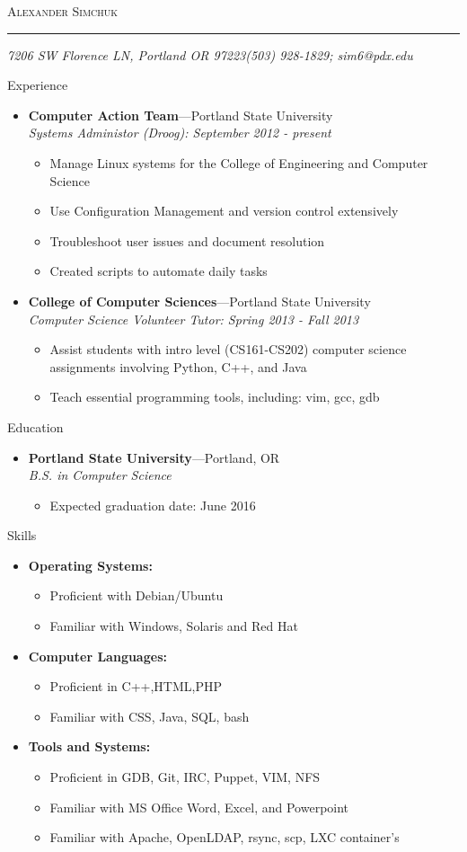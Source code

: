 \documentclass[11pt,oneside]{article}
\makeatletter
\newcommand{\name}{Alexander Simchuk}
\newcommand{\addr}{7206 SW Florence LN, Portland OR 97223}
\newcommand{\phone}{(503) 928-1829}
\newcommand{\email}{sim6@pdx.edu}
\newcommand{\bigname}[1]{
	\begin{center}\fontfamily{phv}\selectfont\Huge\scshape#1\end{center}
}
\newenvironment{ressection}[1]{
	\vspace{4pt}
	{\fontfamily{phv}\selectfont\Large#1}
	\begin{itemize}
	\vspace{3pt}
}{
	\end{itemize}
}
\newcommand{\resitem}[1]{
	\vspace{-4pt}
	\item \begin{flushleft} #1 \end{flushleft}
}
\newcommand{\ressubitem}[1]{
	\vspace{-1pt}
	\item \begin{flushleft} #1 \end{flushleft}
}
\newcommand{\resbigitem}[3]{
	\vspace{-5pt}
	\item
	\textbf{#1}---#2 \\
	\textit{#3}
}
\newenvironment{ressubsec}[3]{
	\resbigitem{#1}{#2}{#3}
	\vspace{-2pt}
	\begin{itemize}
}{
	\end{itemize}
}
\newenvironment{reslist}[1]{
	\resitem{\textbf{#1}}
	\vspace{-5pt}
	\begin{itemize}
}{
	\end{itemize}
}
\makeatother
\begin{document}
 \selectfont
\bigname{\name}
\vspace{-8pt} \rule{\textwidth}{1pt}
\vspace{-1pt} {\small\itshape \addr \hfill \phone; \email}
\vspace{8 pt}


\begin{ressection}{Experience}
    \begin{ressubsec}{Computer Action Team}{Portland State University}{Systems Administor (Droog): September 2012 - present}
		\ressubitem{Manage Linux systems for the College of Engineering and Computer Science}
		\ressubitem{Use Configuration Management and version control extensively}
		\ressubitem{Troubleshoot user issues and document resolution}
		\ressubitem{Created scripts to automate daily tasks}
	\end{ressubsec}
	\begin{ressubsec}{College of Computer Sciences}{Portland State University}{Computer Science Volunteer Tutor: Spring 2013 - Fall 2013}
        \ressubitem{Assist students with intro level (CS161-CS202) computer science assignments involving Python, C++, and Java}
        \ressubitem{Teach essential programming tools, including: vim, gcc, gdb}
	\end{ressubsec}
\end{ressection}


\begin{ressection}{Education}
    \begin{ressubsec}{Portland State University}{Portland, OR}{B.S. in Computer Science}
		\ressubitem{Expected graduation date: June 2016}
	\end{ressubsec}
\end{ressection}


\begin{ressection}{Skills}
    \begin{reslist}{Operating Systems:}
        \ressubitem{Proficient with Debian/Ubuntu}
        \ressubitem{Familiar with Windows, Solaris and Red Hat}
	\end{reslist}
	\begin{reslist}{Computer Languages:}
        \ressubitem{Proficient in C++,HTML,PHP}
        \ressubitem{Familiar with CSS, Java, SQL, bash}
	\end{reslist}
	\begin{reslist}{Tools and Systems:}
        \ressubitem{Proficient in GDB, Git, IRC, Puppet, VIM, NFS}
	\ressubitem{Familiar with MS Office Word, Excel, and Powerpoint}
        \ressubitem{Familiar with Apache, OpenLDAP, rsync, scp, LXC container's}
	\end{reslist}
\end{ressection}
\end{document}
